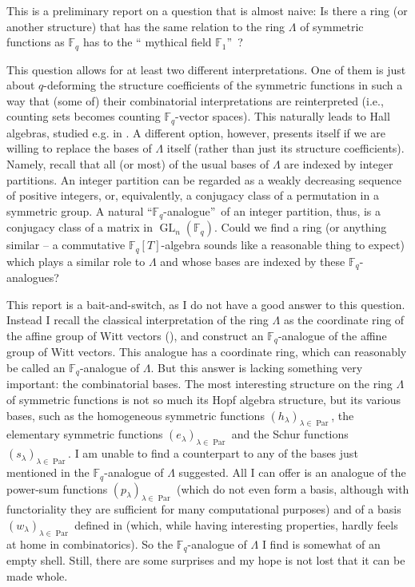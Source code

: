 \documentclass[numbers=enddot,12pt,final,onecolumn,notitlepage]{scrartcl}%
\theoremstyle{definition}
\begin{document}
This is a preliminary report on a question that is almost naive: Is there a
ring (or another structure) that has the same relation to the ring $\Lambda$
of symmetric functions as $\mathbb{F}_{q}$ has to the \textquotedblleft
mythical field $\mathbb{F}_{1}$\textquotedblright\ ?

This question allows for at least two different interpretations. One of them
is just about $q$-deforming the structure coefficients of the symmetric
functions in such a way that (some of) their combinatorial interpretations are
reinterpreted (i.e., counting sets becomes counting $\mathbb{F}_{q}$-vector
spaces). This naturally leads to Hall algebras, studied e.g. in
\cite{dyckerhoff}. A different option, however, presents itself if we are
willing to replace the bases of $\Lambda$ itself (rather than just its
structure coefficients). Namely, recall that all (or most) of the usual bases
of $\Lambda$ are indexed by integer partitions. An integer partition can be
regarded as a weakly decreasing sequence of positive integers, or,
equivalently, a conjugacy class of a permutation in a symmetric group. A
natural \textquotedblleft$\mathbb{F}_{q}$-analogue\textquotedblright\ of an
integer partition, thus, is a conjugacy class of a matrix in
$\operatorname*{GL}\nolimits_{n}\left(  \mathbb{F}_{q}\right)  $. Could we
find a ring (or anything similar -- a commutative $\mathbb{F}_{q}\left[
T\right]  $-algebra sounds like a reasonable thing to expect) which plays a
similar role to $\Lambda$ and whose bases are indexed by these $\mathbb{F}%
_{q}$-analogues?

This report is a bait-and-switch, as I do not have a good answer to this
question. Instead I recall the classical interpretation of the ring $\Lambda$
as the coordinate ring of the affine group of Witt vectors (\cite[\S 9--\S 10]%
{hw-witt1}), and construct an $\mathbb{F}_{q}$-analogue of the affine group of
Witt vectors. This analogue has a coordinate ring, which can reasonably be
called an $\mathbb{F}_{q}$-analogue of $\Lambda$. But this answer is lacking
something very important: the combinatorial bases. The most interesting
structure on the ring $\Lambda$ of symmetric functions is not so much its Hopf
algebra structure, but its various bases, such as the homogeneous symmetric
functions $\left(  h_{\lambda}\right)  _{\lambda\in\operatorname*{Par}}$, the
elementary symmetric functions $\left(  e_{\lambda}\right)  _{\lambda
\in\operatorname*{Par}}$ and the Schur functions $\left(  s_{\lambda}\right)
_{\lambda\in\operatorname*{Par}}$. I am unable to find a counterpart to any of
the bases just mentioned in the $\mathbb{F}_{q}$-analogue of $\Lambda$
suggested. All I can offer is an analogue of the power-sum functions $\left(
p_{\lambda}\right)  _{\lambda\in\operatorname*{Par}}$ (which do not even form
a basis, although with functoriality they are sufficient for many
computational purposes) and of a basis $\left(  w_{\lambda}\right)
_{\lambda\in\operatorname*{Par}}$ defined in \cite[Exercise 2.9.3
(c)]{reiner-hopf} (which, while having interesting properties, hardly feels at
home in combinatorics). So the $\mathbb{F}_{q}$-analogue of $\Lambda$ I find
is somewhat of an empty shell. Still, there are some surprises and my hope is
not lost that it can be made whole.
\end{document}
